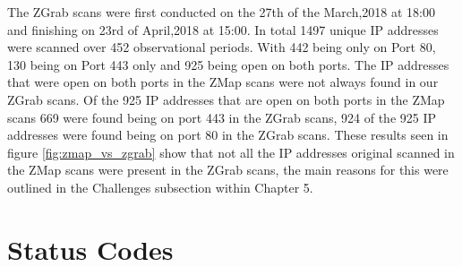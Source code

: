 \documentclass[a4wide,leqno,12pt]{report}
\begin{document}
The ZGrab scans were first conducted on the 27th of the March,2018 at 18:00 and finishing on 23rd of April,2018 at 15:00. In total 1497 unique IP addresses were scanned over 452 observational periods. With 442 being only on Port 80, 130 being on Port 443 only and 925 being open on both ports. The IP addresses that were open on both ports in the ZMap scans were not always found in our ZGrab scans. Of the 925 IP addresses that are open on both ports in the ZMap scans 669 were found being on port 443 in the ZGrab scans, 924 of the 925 IP addresses were found being on port 80 in the ZGrab scans. These results seen in figure \ref{fig:zmap_vs_zgrab} show that not all the IP addresses original scanned in the ZMap scans were present in the ZGrab scans, the main reasons for this were outlined in the Challenges subsection within Chapter 5.
\section{Status Codes}
\end{document}
